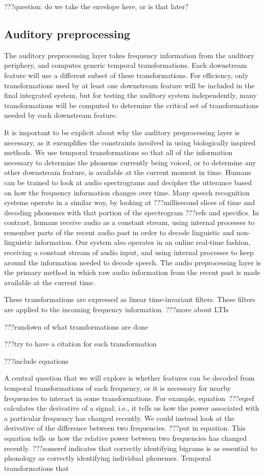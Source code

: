 ???question: do we take the envelope here,
or is that later?

\subsection{Auditory preprocessing}

The auditory preprocessing layer
takes frequency information from the auditory periphery,
and computes generic temporal transformations.
Each downstream feature will use a different
subset of these transformations.
For efficiency,
only transformations used by at least one
downstream feature will be
included in the final integrated system,
but for testing the auditory system independently,
many transformations will be computed
to determine the critical set of
transformations needed by each downstream feature.

It is important to be explicit about
why the auditory preprocessing layer is necessary,
as it exemplifies the constraints involved in
using biologically inspired methods.
We use temporal transformations
so that all of the information necessary
to determine the phoneme currently being voiced,
or to determine any other downstream feature,
is available at the current moment in time.
Humans can be trained to look at
audio spectrograms and decipher
the utterance based on how the
frequency information changes over time.
Many speech recognition systems operate
in a similar way, by looking at
???millisecond slices of time
and decoding phonemes with that portion
of the spectrogram ???refs and specifics.
In contrast, humans receive audio
as a constant stream,
using internal processes to remember
parts of the recent audio past
in order to decode linguistic
and non-linguistic information.
Our system also operates in
an online real-time fashion,
receiving a constant stream of audio input,
and using internal processes
to keep around the information
needed to decode speech.
The audio preprocessing layer
is the primary method in which
raw audio information from the recent past
is made available at the current time.

These transformations are expressed as
linear time-invariant filters.
These filters are applied to the incoming
frequency information.
???more about LTIs

???rundown of what transformations are done

???try to have a citation for each transformation

???include equations

A central question that we will explore
is whether features can be decoded
from temporal transformations
of each frequency,
or it is necessary for nearby frequencies
to interact in some transformations.
For example,
equation~???eqref calculates
the derivative of a signal;
i.e., it tells us how the power associated
with a particular frequency has changed recently.
We could instead look at the derivative
of the difference between two frequencies.
???put in equation.
This equation tells us how the relative
power between two frequencies
has changed recently.
???someref indicates that
correctly identifying bigrams
is as essential to phonology
as correctly identifying individual phonemes.
Temporal transformations that

